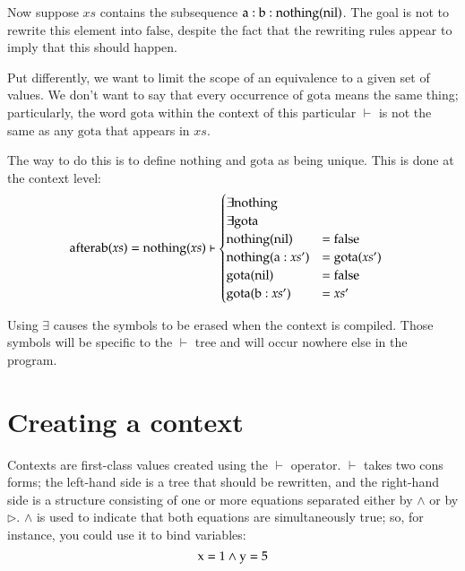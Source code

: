 \documentclass{report}
\begin{document}
    Now suppose $xs$ contains the subsequence $\textrm a : \textrm b : \textrm{nothing}(\textrm{nil})$. The goal is not to rewrite this element into $\textrm{false}$, despite the fact that the
    rewriting rules appear to imply that this should happen.

    Put differently, we want to limit the scope of an equivalence to a given set of values. We don't want to say that every occurrence of $\textrm{gota}$ means the same thing; particularly,
    the word $\textrm{gota}$ within the context of this particular $\vdash$ is not the same as any $\textrm{gota}$ that appears in $xs$.

    The way to do this is to define $\textrm{nothing}$ and $\textrm{gota}$ as being unique. This is done at the context level:
\begin{align*}
\textrm{afterab}(xs) & = \textrm{nothing}(xs) \vdash \begin{cases}
                                                       \exists \textrm{nothing} \\
                                                       \exists \textrm{gota} \\
                                                       \textrm{nothing}(\textrm{nil})    & = \textrm{false} \\
                                                       \textrm{nothing}(\textrm a : xs') & = \textrm{gota}(xs') \\
                                                       \textrm{gota}(\textrm{nil})       & = \textrm{false} \\
                                                       \textrm{gota}(\textrm b : xs')    & = xs'
                                                     \end{cases}
\end{align*}

    Using $\exists$ causes the symbols to be erased when the context is compiled. Those symbols will be specific to the $\vdash$ tree and will occur nowhere else in the program.

\section{Creating a context}
    Contexts are first-class values created using the $\vdash$ operator. $\vdash$ takes two cons forms; the left-hand side is a tree that should be rewritten, and the right-hand side is a
    structure consisting of one or more equations separated either by $\wedge$ or by $\rhd$. $\wedge$ is used to indicate that both equations are simultaneously true; so, for instance, you
    could use it to bind variables:
    $$
      \textrm x = 1 \wedge \textrm y = 5
    $$
\end{document}
